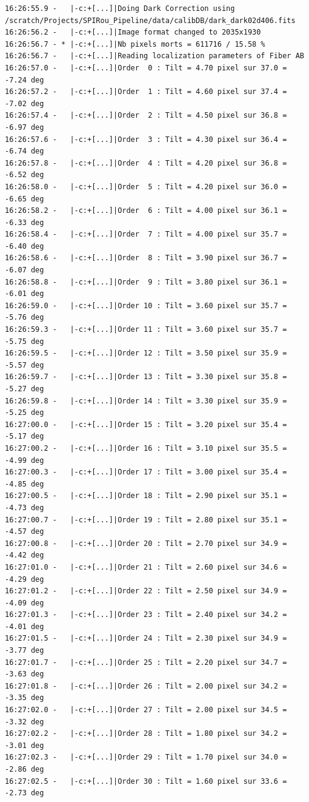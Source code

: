 \begin{lstlisting}[style=text]
16:26:55.9 -   |-c:+[...]|Doing Dark Correction using /scratch/Projects/SPIRou_Pipeline/data/calibDB/dark_dark02d406.fits
16:26:56.2 -   |-c:+[...]|Image format changed to 2035x1930
16:26:56.7 - * |-c:+[...]|Nb pixels morts = 611716 / 15.58 %
16:26:56.7 -   |-c:+[...]|Reading localization parameters of Fiber AB
16:26:57.0 -   |-c:+[...]|Order  0 : Tilt = 4.70 pixel sur 37.0 = -7.24 deg
16:26:57.2 -   |-c:+[...]|Order  1 : Tilt = 4.60 pixel sur 37.4 = -7.02 deg
16:26:57.4 -   |-c:+[...]|Order  2 : Tilt = 4.50 pixel sur 36.8 = -6.97 deg
16:26:57.6 -   |-c:+[...]|Order  3 : Tilt = 4.30 pixel sur 36.4 = -6.74 deg
16:26:57.8 -   |-c:+[...]|Order  4 : Tilt = 4.20 pixel sur 36.8 = -6.52 deg
16:26:58.0 -   |-c:+[...]|Order  5 : Tilt = 4.20 pixel sur 36.0 = -6.65 deg
16:26:58.2 -   |-c:+[...]|Order  6 : Tilt = 4.00 pixel sur 36.1 = -6.33 deg
16:26:58.4 -   |-c:+[...]|Order  7 : Tilt = 4.00 pixel sur 35.7 = -6.40 deg
16:26:58.6 -   |-c:+[...]|Order  8 : Tilt = 3.90 pixel sur 36.7 = -6.07 deg
16:26:58.8 -   |-c:+[...]|Order  9 : Tilt = 3.80 pixel sur 36.1 = -6.01 deg
16:26:59.0 -   |-c:+[...]|Order 10 : Tilt = 3.60 pixel sur 35.7 = -5.76 deg
16:26:59.3 -   |-c:+[...]|Order 11 : Tilt = 3.60 pixel sur 35.7 = -5.75 deg
16:26:59.5 -   |-c:+[...]|Order 12 : Tilt = 3.50 pixel sur 35.9 = -5.57 deg
16:26:59.7 -   |-c:+[...]|Order 13 : Tilt = 3.30 pixel sur 35.8 = -5.27 deg
16:26:59.8 -   |-c:+[...]|Order 14 : Tilt = 3.30 pixel sur 35.9 = -5.25 deg
16:27:00.0 -   |-c:+[...]|Order 15 : Tilt = 3.20 pixel sur 35.4 = -5.17 deg
16:27:00.2 -   |-c:+[...]|Order 16 : Tilt = 3.10 pixel sur 35.5 = -4.99 deg
16:27:00.3 -   |-c:+[...]|Order 17 : Tilt = 3.00 pixel sur 35.4 = -4.85 deg
16:27:00.5 -   |-c:+[...]|Order 18 : Tilt = 2.90 pixel sur 35.1 = -4.73 deg
16:27:00.7 -   |-c:+[...]|Order 19 : Tilt = 2.80 pixel sur 35.1 = -4.57 deg
16:27:00.8 -   |-c:+[...]|Order 20 : Tilt = 2.70 pixel sur 34.9 = -4.42 deg
16:27:01.0 -   |-c:+[...]|Order 21 : Tilt = 2.60 pixel sur 34.6 = -4.29 deg
16:27:01.2 -   |-c:+[...]|Order 22 : Tilt = 2.50 pixel sur 34.9 = -4.09 deg
16:27:01.3 -   |-c:+[...]|Order 23 : Tilt = 2.40 pixel sur 34.2 = -4.01 deg
16:27:01.5 -   |-c:+[...]|Order 24 : Tilt = 2.30 pixel sur 34.9 = -3.77 deg
16:27:01.7 -   |-c:+[...]|Order 25 : Tilt = 2.20 pixel sur 34.7 = -3.63 deg
16:27:01.8 -   |-c:+[...]|Order 26 : Tilt = 2.00 pixel sur 34.2 = -3.35 deg
16:27:02.0 -   |-c:+[...]|Order 27 : Tilt = 2.00 pixel sur 34.5 = -3.32 deg
16:27:02.2 -   |-c:+[...]|Order 28 : Tilt = 1.80 pixel sur 34.2 = -3.01 deg
16:27:02.3 -   |-c:+[...]|Order 29 : Tilt = 1.70 pixel sur 34.0 = -2.86 deg
16:27:02.5 -   |-c:+[...]|Order 30 : Tilt = 1.60 pixel sur 33.6 = -2.73 deg

\end{lstlisting}
